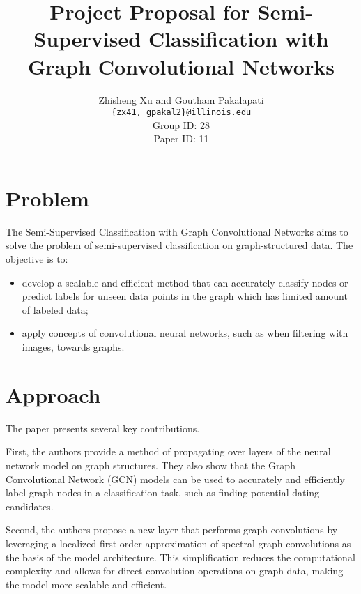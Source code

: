 \documentclass[11pt,a4paper]{article}
\title{Project Proposal for Semi-Supervised Classification with Graph Convolutional Networks}
\author{Zhisheng Xu and Goutham Pakalapati\\
  \texttt{\{zx41, gpakal2\}@illinois.edu}
  \\[2em]
  Group ID: 28\\
  Paper ID: 11
}
\begin{document}
\maketitle


\section{Problem}
The Semi-Supervised Classification with Graph Convolutional Networks \cite{kipf2017semi} aims to solve the problem of semi-supervised classification on graph-structured data. The objective is to:

\begin{itemize}
  \item develop a scalable and efficient method that can accurately classify nodes or predict labels for unseen data points in the graph which has limited amount of labeled data;
  \item apply concepts of convolutional neural networks, such as when filtering with images, towards graphs.
\end{itemize}


\section{Approach}


The paper presents several key contributions.

First, the authors provide a method of propagating over layers of the neural network model on graph structures. They also show that the Graph Convolutional Network (GCN) models can be used to accurately and efficiently label graph nodes in a classification task, such as finding potential dating candidates.

Second, the authors propose a new layer that performs graph convolutions by leveraging a localized first-order approximation of spectral graph convolutions as the basis of the model architecture. This simplification reduces the computational complexity and allows for direct convolution operations on graph data, making the model more scalable and efficient.
\end{document}
